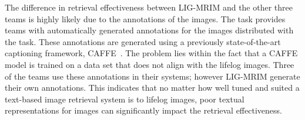 The difference in retrieval effectiveness between LIG-MRIM and the other three teams is highly likely due to the annotations of the images. The task provides teams with automatically generated annotations for the images distributed with the task. These annotations are generated using a previously state-of-the-art captioning framework, CAFFE~\cite{jia2014caffe}. The problem lies within the fact that a CAFFE model is trained on a data set that does not align with the lifelog images. Three of the teams use these annotations in their systems; however LIG-MRIM generate their own annotations. This indicates that no matter how well tuned and suited a text-based image retrieval system is to lifelog images, poor textual representations for images can significantly impact the retrieval effectiveness.